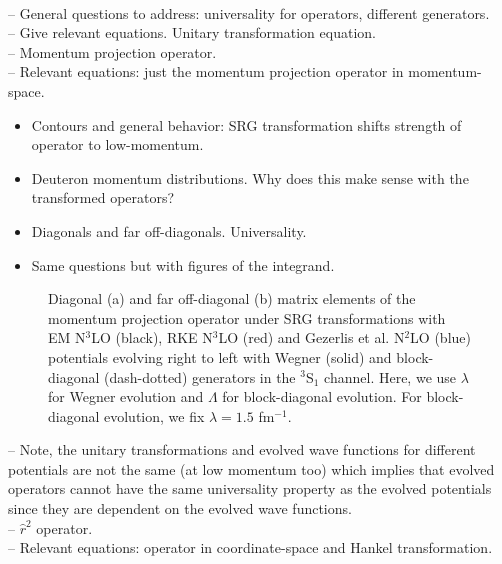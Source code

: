 \documentclass[preprintnumbers,floatfix,aps,prc,preprint,nofootinbib]{revtex4-1}
\begin{document}
\\
-- General questions to address: universality for operators, different generators.
\\
-- Give relevant equations. Unitary transformation equation.
\\
-- Momentum projection operator.
\\
-- Relevant equations: just the momentum projection operator in momentum-space.
%
\begin{itemize}
	\item Contours and general behavior: SRG transformation shifts strength of operator to low-momentum.
	\item Deuteron momentum distributions. Why does this make sense with the transformed operators?
	\item Diagonals and far off-diagonals. Universality.
	\item Same questions but with figures of the integrand.
\end{itemize}
%
\begin{figure}[H]
	\centering
	
	\caption{Diagonal (a) and far off-diagonal (b) matrix elements of the momentum projection operator under SRG transformations with EM N$^3$LO (black), RKE N$^3$LO (red) and Gezerlis et al. N$^2$LO (blue) potentials evolving right to left with Wegner (solid) and block-diagonal (dash-dotted) generators in the $^3$S$_1$ channel. Here, we use $\lambda$ for Wegner evolution and $\Lambda$ for block-diagonal evolution. For block-diagonal evolution, we fix $\lambda=1.5$ fm$^{-1}$.}
	\label{fig:momentum_proj_3S1}
\end{figure}
%
-- Note, the unitary transformations and evolved wave functions for different potentials are not the same (at low momentum too) which implies that evolved operators cannot have the same universality property as the evolved potentials since they are dependent on the evolved wave functions.
\\
-- $\hat{r}^2$ operator.
\\
-- Relevant equations: operator in coordinate-space and Hankel transformation.
\end{document}
